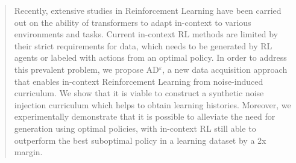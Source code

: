 \documentclass{article}
\theoremstyle{plain}
\theoremstyle{definition}
\theoremstyle{remark}
\begin{document}


\printAffiliationsAndNotice{\icmlEqualContribution} %

\begin{abstract}
Recently, extensive studies in Reinforcement Learning have been carried out on the ability of transformers to adapt in-context to various environments and tasks. Current in-context RL methods are limited by their strict requirements for data, which needs to be generated by RL agents or labeled with actions from an optimal policy. In order to address this prevalent problem, we propose AD$^\varepsilon$, a new data acquisition approach that enables in-context Reinforcement Learning from noise-induced curriculum. We show that it is viable to construct a synthetic noise injection curriculum which helps to obtain learning histories. Moreover, we experimentally demonstrate that it is possible to alleviate the need for generation using optimal policies, with in-context RL still able to outperform the best suboptimal policy in a learning dataset by a 2x margin. 

\end{abstract}
\end{document}
